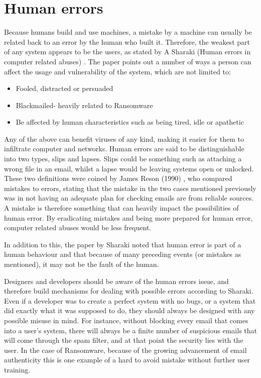 \documentclass[journal,comsoc]{IEEEtran}
\begin{document}
\section{Human errors}
Because humans build and use machines, a mistake by a machine can usually be related back to an error by the human who built it. Therefore, the weakest part of any system appears to be the users, as stated by A Sharaki (Human errors in computer related abuses) \cite{paper1}. The paper points out a number of ways a person can affect the usage and vulnerability of the system, which are not limited to:
\begin{itemize}
\item Fooled, distracted or persuaded
\item Blackmailed- heavily related to Ransomware
\item Be affected by human characteristics such as being tired, idle or apathetic
\end{itemize}
Any of the above can benefit viruses of any kind, making it easier for them to infiltrate computer and networks. Human errors are said to be distinguishable into two types, slips and lapses. Slips could be something such as attaching a wrong file in an email, whilst a lapse would be leaving systems open or unlocked. These two definitions were coined by James Reson (1990) \cite{james}, who compared mistakes to errors, stating that the mistake in the two cases mentioned previously was in not having an adequate plan for checking emails are from reliable sources. A mistake is therefore something that can heavily impact the possibilities of human error. By eradicating mistakes and being more prepared for human error, computer related abuses would be less frequent. \par
In addition to this, the paper by Sharaki noted that human error is part of a human behaviour and that because of many preceding events (or mistakes as mentioned), it may not be the fault of the human. \par
Designers and developers should be aware of the human errors issue, and therefore build mechanisms for dealing with possible errors according to Sharaki. Even if a developer was to create a perfect system with no bugs, or a system that did exactly what it was supposed to do, they should always be designed with any possible misuse in mind. For instance, without blocking every email that comes into a user's system, there will always be a finite number of suspicious emails that will come through the spam filter, and at that point the security lies with the user. In the case of Ransomware, because of the growing advancement of email authenticity this is one example of a hard to avoid mistake without further user training. \par
\end{document}
